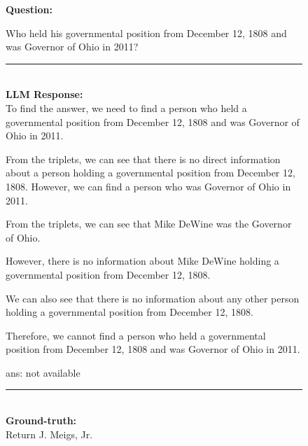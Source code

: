 \begin{figure}
\begin{tcolorbox}[colback=gray!5!white, colframe=gray!75!black, title=CWQ-WebQTest-12\_c701ad2b5b8ef3f3ed26dd2ed8703d05]
\scriptsize

\textbf{Question:}\\
\raggedright Who held his governmental position from December 12, 1808 and was Governor of Ohio in 2011?

\rule{\linewidth}{0.4pt}
\\
\textbf{LLM Response:}\\
To find the answer, we need to find a person who held a governmental position from December 12, 1808 and was Governor of Ohio in 2011.



From the triplets, we can see that there is no direct information about a person holding a governmental position from December 12, 1808. However, we can find a person who was Governor of Ohio in 2011.



From the triplets, we can see that Mike DeWine was the Governor of Ohio.



However, there is no information about Mike DeWine holding a governmental position from December 12, 1808.



We can also see that there is no information about any other person holding a governmental position from December 12, 1808.



Therefore, we cannot find a person who held a governmental position from December 12, 1808 and was Governor of Ohio in 2011.



ans: not available

\rule{\linewidth}{0.4pt}
\\
\textbf{Ground-truth:}\\
Return J. Meigs, Jr.

\end{tcolorbox}
\end{figure}
